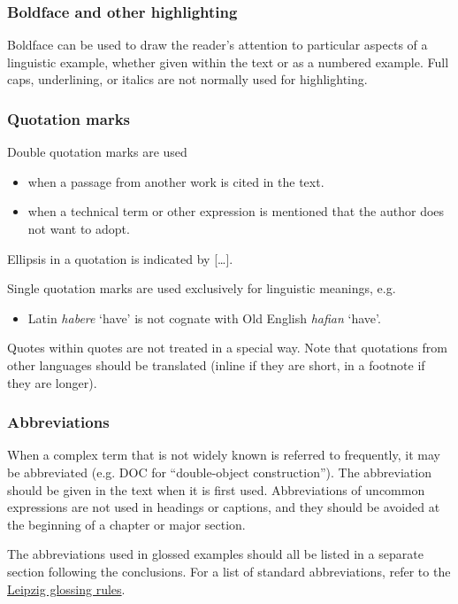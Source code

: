 \documentclass[charis,linguex]{glossa}
\begin{document}
\subsubsection{Boldface and other highlighting}
Boldface can be used to draw the reader’s attention to particular aspects of a linguistic example, whether given within the text or as a numbered example. Full caps, underlining, or italics are not normally used for highlighting.

\subsubsection{Quotation marks}
Double quotation marks are used

\begin{itemize}
\item when a passage from another work is cited in the text.
\item when a technical term or other expression is mentioned that the author does not want to adopt.
\end{itemize}
Ellipsis in a quotation is indicated by [\ldots].

Single quotation marks are used exclusively for linguistic meanings, e.g.
\begin{itemize}
\item Latin \textit{habere} ‘have’ is not cognate with Old English \textit{hafian} ‘have’.
\end{itemize}
Quotes within quotes are not treated in a special way.
Note that quotations from other languages should be translated (inline if they are short, in a footnote if they are longer).

\subsubsection{Abbreviations}
When a complex term that is not widely known is referred to frequently, it may be abbreviated (e.g. DOC for ``double-object construction''). The abbreviation should be given in the text when it is first used. Abbreviations of uncommon expressions are not used in headings or captions, and they should be avoided at the beginning of a chapter or major section.

The abbreviations used in glossed examples should all be listed in a separate section following the conclusions. For a list of standard abbreviations, refer to the \href{https://www.eva.mpg.de/lingua/resources/glossing-rules.php}{Leipzig glossing rules}. 
\end{document}
